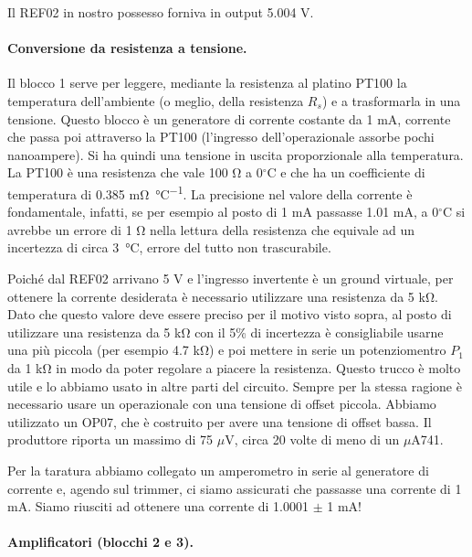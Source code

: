 Il REF02 in nostro possesso forniva in output 5.004 V. 

\paragraph{Conversione da resistenza a tensione.}

Il blocco 1 serve per leggere, mediante la resistenza al platino PT100 la temperatura dell'ambiente (o meglio, della
resistenza $R_s$) e a trasformarla in una tensione. Questo blocco è un generatore di corrente costante da 1 mA, corrente
che passa poi attraverso la PT100 (l'ingresso dell'operazionale assorbe pochi nanoampere). Si ha quindi una tensione in uscita
proporzionale alla temperatura.
La PT100 è una resistenza che vale 100 \si{\ohm} a 0$^\circ$C e che ha un coefficiente di temperatura di 0.385 \si{\milli\ohm\per\celsius}.
La precisione nel valore della corrente è fondamentale, infatti, se per esempio al posto di 1 mA passasse 1.01 mA,
a 0$^\circ$C si avrebbe un errore di 1 \si{\ohm} nella lettura della resistenza che equivale ad un incertezza di circa \SI{3}{\celsius},
errore del tutto non trascurabile.

Poiché dal REF02 arrivano 5 V e l'ingresso invertente è un ground virtuale, per ottenere la corrente desiderata
è necessario utilizzare una resistenza da 5 \si{\kilo\ohm}. Dato che questo valore deve essere preciso per il motivo visto sopra, al posto
di utilizzare una resistenza da 5 \si{\kilo\ohm} con il 5\% di incertezza è consigliabile usarne una più piccola
(per esempio 4.7 \si{\kilo\ohm}) e poi mettere in serie un potenziomentro $P_1$ da 1 \si{\kilo\ohm}
in modo da poter regolare a piacere la resistenza. Questo trucco è molto utile e lo abbiamo usato in altre parti del circuito.
Sempre per la stessa ragione è necessario usare un operazionale con una tensione di offset piccola.
Abbiamo utilizzato un OP07, che è costruito per avere una tensione
di offset bassa. Il produttore riporta un massimo di 75 $\mu$V, circa 20 volte di meno di un $\mu$A741. 

Per la taratura abbiamo collegato un amperometro in serie al generatore di corrente e, agendo sul trimmer,
ci siamo assicurati che passasse una corrente di 1 mA. Siamo riusciti ad ottenere una corrente di 1.0001 $\pm$ 1 mA!

\paragraph{Amplificatori (blocchi 2 e 3).}

